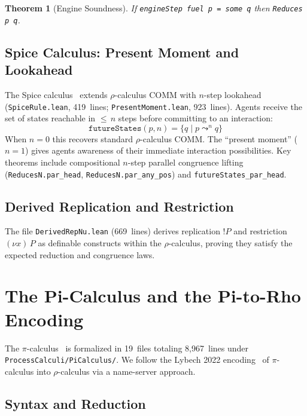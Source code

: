\documentclass[11pt]{article}
\newtheorem{theorem}{Theorem}[section]
\theoremstyle{definition}
\theoremstyle{remark}
\begin{document}
\begin{theorem}[Engine Soundness]
If \texttt{engineStep fuel p = some q} then \texttt{Reduces p q}.
\end{theorem}

\subsection{Spice Calculus: Present Moment and Lookahead}

The Spice calculus~\cite{MeredithPresentMoment2026} extends $\rho$-calculus
COMM with $n$-step lookahead (\texttt{SpiceRule.lean}, 419~lines;
\texttt{PresentMoment.lean}, 923~lines).  Agents receive the set of
states reachable in ${\leq}\, n$ steps before committing to an
interaction:
\[
  \texttt{futureStates}(p, n) = \{q \mid p \leadsto^n q\}
\]
When $n = 0$ this recovers standard $\rho$-calculus COMM.  The ``present
moment'' ($n = 1$) gives agents awareness of their immediate interaction
possibilities.  Key theorems include compositional $n$-step parallel
congruence lifting (\texttt{ReducesN.par\_head},
\texttt{ReducesN.par\_any\_pos}) and
\texttt{futureStates\_par\_head}.

\subsection{Derived Replication and Restriction}

The file \texttt{DerivedRepNu.lean} (669~lines) derives replication
$!P$ and restriction $(\nu x)\, P$ as definable constructs within
the $\rho$-calculus, proving they satisfy the expected reduction and
congruence laws.


\section{The Pi-Calculus and the Pi-to-Rho Encoding}
\label{sec:pi}

The $\pi$-calculus~\cite{Milner1999,SangiorgiWalker2001} is formalized
in 19~files totaling 8{,}967~lines under \texttt{ProcessCalculi/PiCalculus/}.
We follow the Lybech 2022 encoding~\cite{Lybech2022} of $\pi$-calculus
into $\rho$-calculus via a name-server approach.

\subsection{Syntax and Reduction}
\end{document}
